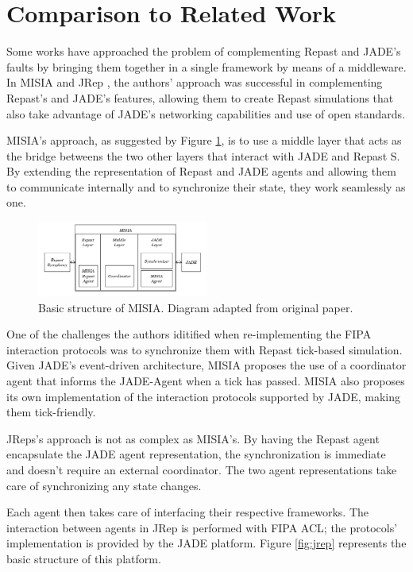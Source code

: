 \section{Comparison to Related Work} %
\label{sec:related_work}

Some works have approached the problem of complementing Repast and JADE's faults by bringing them together in a single framework by means of a middleware. In MISIA \cite{garcia2011misia} and JRep \cite{gormer2011jrep}, the authors' approach was successful in complementing Repast's and JADE's features, allowing them to create Repast simulations that also take advantage of JADE's networking capabilities and use of open standards.

MISIA's approach, as suggested by Figure \ref{fig:misia}, is to use a middle layer that acts as the bridge betweens the two other layers that interact with JADE and Repast S. By extending the representation of Repast and JADE agents and allowing them to communicate internally and to synchronize their state,
they work seamlessly as one.

\begin{figure}[h]
	\centering
	\includegraphics[width=0.5\textwidth]{figures/MISIA.png}
	\caption{Basic structure of MISIA. Diagram
		adapted from original paper. \cite{garcia2011misia}}
	\label{fig:misia}
\end{figure}

One of the challenges the authors iditified when re-implementing the FIPA interaction protocols was to synchronize them with Repast tick-based simulation. Given JADE's event-driven architecture, MISIA proposes the use of a coordinator agent that informs the JADE-Agent when a tick has passed. MISIA also proposes its own implementation of the interaction protocols supported by JADE, making them tick-friendly.

JReps's approach is not as complex as MISIA's. By having the Repast agent encapsulate the JADE agent representation, the synchronization is immediate and doesn't require an external coordinator. The two agent representations take care of synchronizing any state changes.

Each agent then takes care of interfacing their respective frameworks. The interaction between agents in JRep is performed with FIPA ACL; the protocols' implementation is provided by the JADE platform. Figure \ref{fig:jrep} represents the basic structure of this platform.

